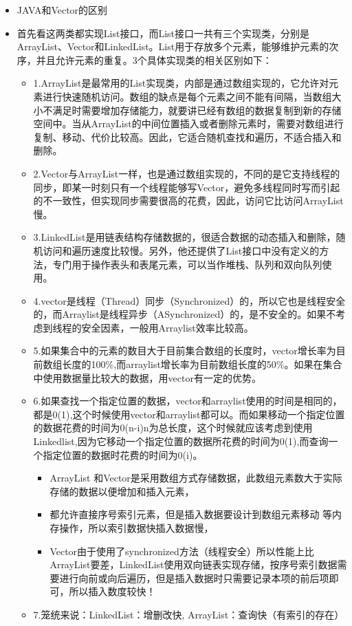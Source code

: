\documentclass[9pt, b5paper]{article}
\begin{document}
\begin{itemize}
\item JAVA和Vector的区别
\item 首先看这两类都实现List接口，而List接口一共有三个实现类，分别是ArrayList、Vector和LinkedList。List用于存放多个元素，能够维护元素的次序，并且允许元素的重复。3个具体实现类的相关区别如下：
\begin{itemize}
\item 1.ArrayList是最常用的List实现类，内部是通过数组实现的，它允许对元素进行快速随机访问。数组的缺点是每个元素之间不能有间隔，当数组大小不满足时需要增加存储能力，就要讲已经有数组的数据复制到新的存储空间中。当从ArrayList的中间位置插入或者删除元素时，需要对数组进行复制、移动、代价比较高。因此，它适合随机查找和遍历，不适合插入和删除。
\item 2.Vector与ArrayList一样，也是通过数组实现的，不同的是它支持线程的同步，即某一时刻只有一个线程能够写Vector，避免多线程同时写而引起的不一致性，但实现同步需要很高的花费，因此，访问它比访问ArrayList慢。
\item 3.LinkedList是用链表结构存储数据的，很适合数据的动态插入和删除，随机访问和遍历速度比较慢。另外，他还提供了List接口中没有定义的方法，专门用于操作表头和表尾元素，可以当作堆栈、队列和双向队列使用。
\item 4.vector是线程（Thread）同步（Synchronized）的，所以它也是线程安全的，而Arraylist是线程异步（ASynchronized）的，是不安全的。如果不考虑到线程的安全因素，一般用Arraylist效率比较高。
\item 5.如果集合中的元素的数目大于目前集合数组的长度时，vector增长率为目前数组长度的100\%,而arraylist增长率为目前数组长度的50\%。如果在集合中使用数据量比较大的数据，用vector有一定的优势。
\item 6.如果查找一个指定位置的数据，vector和arraylist使用的时间是相同的，都是0(1),这个时候使用vector和arraylist都可以。而如果移动一个指定位置的数据花费的时间为0(n-i)n为总长度，这个时候就应该考虑到使用Linkedlist,因为它移动一个指定位置的数据所花费的时间为0(1),而查询一个指定位置的数据时花费的时间为0(i)。
\begin{itemize}
\item ArrayList 和Vector是采用数组方式存储数据，此数组元素数大于实际存储的数据以便增加和插入元素，
\item 都允许直接序号索引元素，但是插入数据要设计到数组元素移动 等内存操作，所以索引数据快插入数据慢，
\item Vector由于使用了synchronized方法（线程安全）所以性能上比ArrayList要差，LinkedList使用双向链表实现存储，按序号索引数据需要进行向前或向后遍历，但是插入数据时只需要记录本项的前后项即可，所以插入数度较快！
\end{itemize}
\item 7.笼统来说：LinkedList：增删改快, ArrayList：查询快（有索引的存在）
\end{itemize}
\end{itemize}
\end{document}
